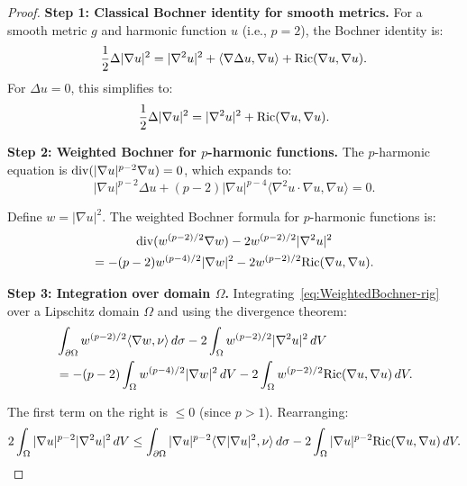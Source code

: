 \begin{proof}
\textbf{Step 1: Classical Bochner identity for smooth metrics.}
For a smooth metric $g$ and harmonic function $u$ (i.e., $p = 2$), the Bochner identity is:
\begin{equation}\label{eq:ClassicalBochner-rig}
    \frac{1}{2} \Delta |\nabla u|^2 = |\nabla^2 u|^2 + \langle \nabla \Delta u, \nabla u \rangle + \mathrm{Ric}(\nabla u, \nabla u).
\end{equation}
For $\Delta u = 0$, this simplifies to:
\begin{equation}\label{eq:SimplifiedBochner}
    \frac{1}{2} \Delta |\nabla u|^2 = |\nabla^2 u|^2 + \mathrm{Ric}(\nabla u, \nabla u).
\end{equation}

\textbf{Step 2: Weighted Bochner for $p$-harmonic functions.}
The $p$-harmonic equation is $\mathrm{div}(|\nabla u|^{p-2} \nabla u) = 0$, which expands to:
\begin{equation}\label{eq:PHarmonicExpanded}
    |\nabla u|^{p-2} \Delta u + (p-2) |\nabla u|^{p-4} \langle \nabla^2 u \cdot \nabla u, \nabla u \rangle = 0.
\end{equation}

Define $w = |\nabla u|^2$. The weighted Bochner formula for $p$-harmonic functions is:
\begin{multline}\label{eq:WeightedBochner-rig}
    \mathrm{div}(w^{(p-2)/2} \nabla w) - 2 w^{(p-2)/2} |\nabla^2 u|^2 \\
    = -(p-2) w^{(p-4)/2} |\nabla w|^2 - 2 w^{(p-2)/2} \mathrm{Ric}(\nabla u, \nabla u).
\end{multline}

\textbf{Step 3: Integration over domain $\Omega$.}
Integrating~\eqref{eq:WeightedBochner-rig} over a Lipschitz domain $\Omega$ and using the divergence theorem:
\begin{align}
    &\int_{\partial\Omega} w^{(p-2)/2} \langle \nabla w, \nu \rangle \, d\sigma - 2 \int_\Omega w^{(p-2)/2} |\nabla^2 u|^2 \, dV \nonumber\\
    &= -(p-2) \int_\Omega w^{(p-4)/2} |\nabla w|^2 \, dV - 2 \int_\Omega w^{(p-2)/2} \mathrm{Ric}(\nabla u, \nabla u) \, dV. \label{eq:IntegratedBochner}
\end{align}

The first term on the right is $\le 0$ (since $p > 1$). Rearranging:
\begin{equation}\label{eq:RearrangedBochner}
    2 \int_\Omega |\nabla u|^{p-2} |\nabla^2 u|^2 \, dV \le \int_{\partial\Omega} |\nabla u|^{p-2} \langle \nabla |\nabla u|^2, \nu \rangle \, d\sigma - 2 \int_\Omega |\nabla u|^{p-2} \mathrm{Ric}(\nabla u, \nabla u) \, dV.
\end{equation}


\end{proof}
